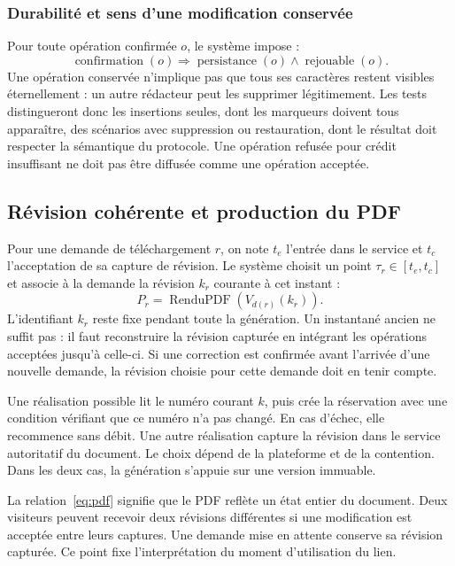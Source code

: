 \subsubsection{Durabilité et sens d'une modification conservée}
Pour toute opération confirmée $o$, le système impose :
\begin{equation}
\operatorname{confirmation}(o)\Longrightarrow
\operatorname{persistance}(o)\land\operatorname{rejouable}(o).
\end{equation}
Une opération conservée n'implique pas que tous ses caractères restent visibles éternellement : un autre rédacteur peut les supprimer légitimement. Les tests distingueront donc les insertions seules, dont les marqueurs doivent tous apparaître, des scénarios avec suppression ou restauration, dont le résultat doit respecter la sémantique du protocole. Une opération refusée pour crédit insuffisant ne doit pas être diffusée comme une opération acceptée.

\subsection{Révision cohérente et production du PDF}
Pour une demande de téléchargement $r$, on note $t_e$ l'entrée dans le service et $t_c$ l'acceptation de sa capture de révision. Le système choisit un point $\tau_r\in[t_e,t_c]$ et associe à la demande la révision $k_r$ courante à cet instant :
\begin{equation}
P_r=\operatorname{RenduPDF}(V_{d(r)}(k_r)).
\label{eq:pdf}
\end{equation}
L'identifiant $k_r$ reste fixe pendant toute la génération. Un instantané ancien ne suffit pas : il faut reconstruire la révision capturée en intégrant les opérations acceptées jusqu'à celle-ci. Si une correction est confirmée avant l'arrivée d'une nouvelle demande, la révision choisie pour cette demande doit en tenir compte.

Une réalisation possible lit le numéro courant $k$, puis crée la réservation avec une condition vérifiant que ce numéro n'a pas changé. En cas d'échec, elle recommence sans débit. Une autre réalisation capture la révision dans le service autoritatif du document. Le choix dépend de la plateforme et de la contention. Dans les deux cas, la génération s'appuie sur une version immuable.

La relation~\eqref{eq:pdf} signifie que le PDF reflète un état entier du document. Deux visiteurs peuvent recevoir deux révisions différentes si une modification est acceptée entre leurs captures. Une demande mise en attente conserve sa révision capturée. Ce point fixe l'interprétation du moment d'utilisation du lien.

